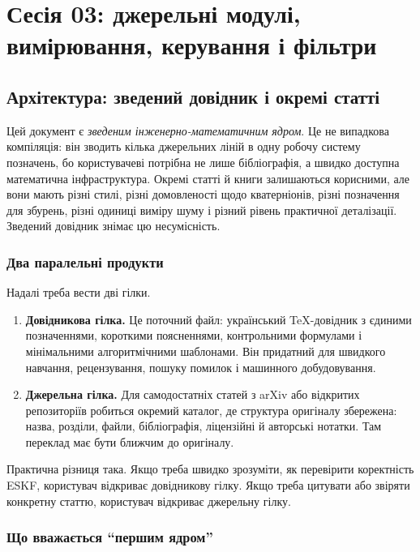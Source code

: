 
\part{Сесія 03: джерельні модулі, вимірювання, керування і фільтри}

\chapter{Архітектура: зведений довідник і окремі статті}

Цей документ є \emph{зведеним інженерно-математичним ядром}. Це не випадкова компіляція: він зводить кілька джерельних ліній в одну робочу систему позначень, бо користувачеві потрібна не лише бібліографія, а швидко доступна математична інфраструктура. Окремі статті й книги залишаються корисними, але вони мають різні стилі, різні домовленості щодо кватерніонів, різні позначення для збурень, різні одиниці виміру шуму і різний рівень практичної деталізації. Зведений довідник знімає цю несумісність.

\section{Два паралельні продукти}

Надалі треба вести дві гілки.

\begin{enumerate}
\item \textbf{Довідникова гілка.} Це поточний файл: український TeX-довідник з єдиними позначеннями, короткими поясненнями, контрольними формулами і мінімальними алгоритмічними шаблонами. Він придатний для швидкого навчання, рецензування, пошуку помилок і машинного добудовування.
\item \textbf{Джерельна гілка.} Для самодостатніх статей з arXiv або відкритих репозиторіїв робиться окремий каталог, де структура оригіналу збережена: назва, розділи, файли, бібліографія, ліцензійні й авторські нотатки. Там переклад має бути ближчим до оригіналу.
\end{enumerate}

Практична різниця така. Якщо треба швидко зрозуміти, як перевірити коректність ESKF, користувач відкриває довідникову гілку. Якщо треба цитувати або звіряти конкретну статтю, користувач відкриває джерельну гілку.

\section{Що вважається ``першим ядром''}

